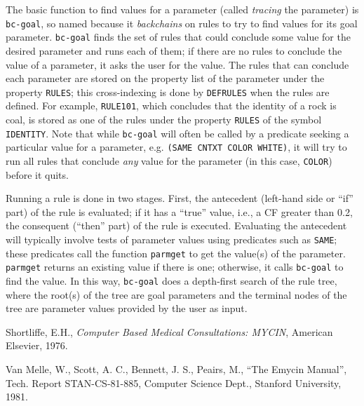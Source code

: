 The basic function to find values for a parameter (called {\em tracing} the
parameter) is {\tt bc-goal}, so named because it {\em backchains} on rules to
try to find values for its goal parameter.  {\tt bc-goal} finds the set of
rules that could conclude some value for the desired parameter and runs
each of them; if there are no rules to conclude the value of a parameter,
it asks the user for the value.  The rules that can conclude each parameter
are stored on the property list of the parameter under the property
{\tt RULES}; this cross-indexing is done by {\tt DEFRULES} when the rules
are defined.  For example, {\tt RULE101}, which concludes that the identity
of a rock is coal, is stored as one of the rules under the property
{\tt RULES} of the symbol {\tt IDENTITY}.  Note that while {\tt bc-goal} will
often be called by a predicate seeking a particular value for a parameter,
e.g. {\tt (SAME\ CNTXT\ COLOR\ WHITE)}, it will try to run all rules that
conclude {\em any} value for the parameter (in this case, {\tt COLOR}) before
it quits.

Running a rule is done in two stages.  First, the antecedent (left-hand side
or ``if'' part) of the rule is evaluated; if it has a ``true'' value, i.e.,
a CF greater than 0.2, the consequent (``then'' part) of the rule is executed.
Evaluating the antecedent will typically involve tests of
parameter values using predicates such as {\tt SAME}; these predicates call
the function {\tt parmget} to get the value(s) of the parameter.  {\tt parmget}
returns an existing value if there is one; otherwise, it calls {\tt bc-goal}
to find the value.  In this way, {\tt bc-goal} does a depth-first search of
the rule tree, where the root(s) of the tree are goal parameters and the
terminal nodes of the tree are parameter values provided by the user as
input.


\begin{thebibliography}{9}

   Shortliffe, E.H., {\em Computer Based Medical Consultations: MYCIN},
   American Elsevier, 1976.

   Van Melle, W., Scott, A. C., Bennett, J. S., Peairs, M., ``The Emycin
   Manual'', Tech. Report STAN-CS-81-885, Computer Science Dept.,
   Stanford University, 1981.

\end{thebibliography}


